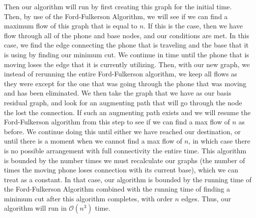\documentclass[11pt,letterpaper]{article}
\begin{document}
Then our algorithm will run by first creating this graph for the initial time. Then, by use of the Ford-Fulkerson Algorithm, we will see if we can find a maximum flow of this graph that is equal to $n$. If this is the case, then we have flow through all of the phone and base nodes, and our conditions are met. In this case, we find the edge connecting the phone that is traveling and the base that it is using by finding our minimum cut. We continue in time until the phone that is moving loses the edge that it is currently utilizing. Then, with our new graph, we instead of rerunning the entire Ford-Fulkerson algorithm, we keep all flows as they were except for the one that was going through the phone that was moving and has been eliminated. We then take the graph that we have as our basis residual graph, and look for an augmenting path that will go through the node the lost the connection. If such an augmenting path exists and we will resume the Ford-Fulkerson algorithm from this step to see if we can find a max flow of $n$ as before. We continue doing this until either we have reached our destination, or until there is a moment when we cannot find a max flow of $n$, in which case there is no possible arrangement with full connectivity the entire time. This algorithm is bounded by the number times we must recalculate our graphs (the number of times the moving phone loses connection with its current base), which we can treat as a constant. In that case, our algorithm is bounded by the running time of the Ford-Fulkerson Algorithm combined with the running time of finding a minimum cut after this algorithm completes, with order $n$ edges. Thus, our algorithm will run in $\mathcal{O}(n^3)$ time. 
\end{document}
